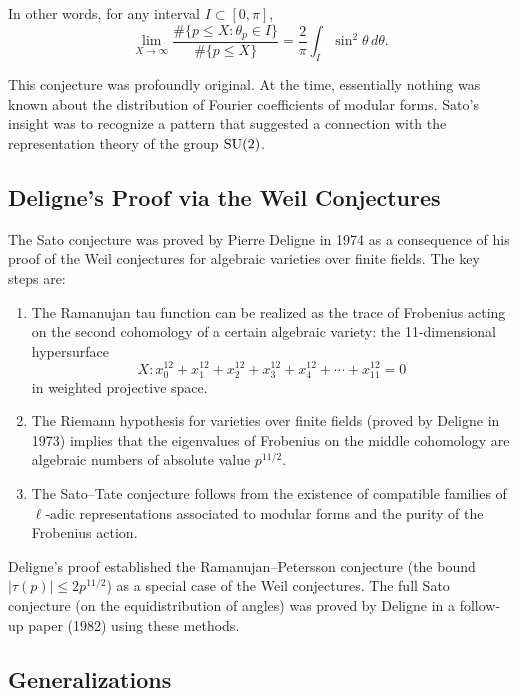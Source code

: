 In other words, for any interval \(I \subset [0,\pi]\),
\[
\lim_{X \to \infty} \frac{\#\{p \leq X : \theta_p \in I\}}{\#\{p \leq X\}} = \frac{2}{\pi} \int_I \sin^2 \theta \, d\theta.
\]

This conjecture was profoundly original. At the time, essentially nothing was known about the distribution of Fourier coefficients of modular forms. Sato's insight was to recognize a pattern that suggested a connection with the representation theory of the group \(\operatorname{SU}(2)\).

\subsection{Deligne's Proof via the Weil Conjectures}

The Sato conjecture was proved by Pierre Deligne in 1974 as a consequence of his proof of the Weil conjectures for algebraic varieties over finite fields. The key steps are:

\begin{enumerate}
    \item The Ramanujan tau function can be realized as the trace of Frobenius acting on the second cohomology of a certain algebraic variety: the 11-dimensional hypersurface
    \[
    X: x_0^{12} + x_1^{12} + x_2^{12} + x_3^{12} + x_4^{12} + \cdots + x_{11}^{12} = 0
    \]
    in weighted projective space.
    
    \item The Riemann hypothesis for varieties over finite fields (proved by Deligne in 1973) implies that the eigenvalues of Frobenius on the middle cohomology are algebraic numbers of absolute value \(p^{11/2}\).
    
    \item The Sato--Tate conjecture follows from the existence of compatible families of \(\ell\)-adic representations associated to modular forms and the purity of the Frobenius action.
\end{enumerate}

Deligne's proof established the Ramanujan--Petersson conjecture (the bound \(|\tau(p)| \leq 2p^{11/2}\)) as a special case of the Weil conjectures. The full Sato conjecture (on the equidistribution of angles) was proved by Deligne in a follow-up paper (1982) using these methods.

\subsection{Generalizations}

